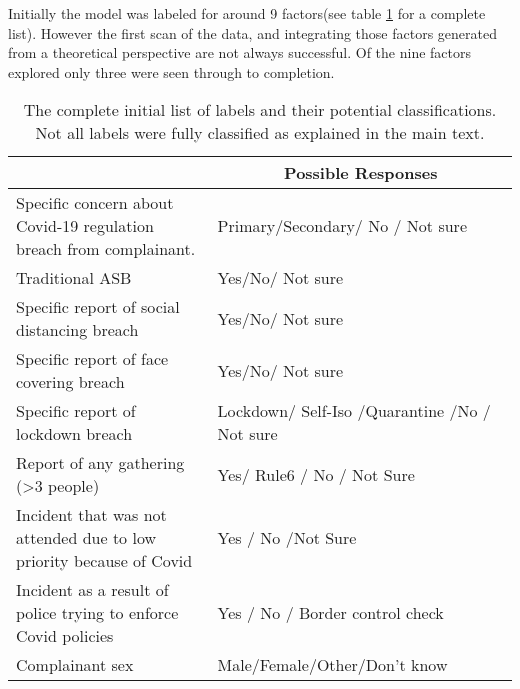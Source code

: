 Initially the model was labeled for around 9 factors(see table \ref{tab:asb_labs} for a complete list). However the first scan of the data, and integrating those factors generated from a theoretical perspective are not always successful. Of the nine factors explored only three were seen through to completion.  
\setlength{\extrarowheight}{12pt}
\begin{table}[]
\centering
\begin{tabular}{p{0.4\linewidth}|p{0.6\linewidth}}
\toprule
\rowcolor[HTML]{C0C0C0} 
\multicolumn{1}{c}{\cellcolor[HTML]{C0C0C0}\textbf{Label}}          & \multicolumn{1}{c}{\cellcolor[HTML]{C0C0C0}\textbf{Possible Responses}} \\ \midrule
Specific concern about Covid-19 regulation breach from complainant.     & Primary/Secondary/ No / Not sure          \\
Traditional ASB                                                         & Yes/No/ Not sure                          \\
Specific report of social distancing breach                             & Yes/No/ Not sure                          \\
Specific report of face covering breach                                 & Yes/No/ Not sure                          \\
Specific report of lockdown breach                                      & Lockdown/ Self-Iso /Quarantine /No / Not sure \\
Report of any gathering (>3 people)                                     & Yes/ Rule6 / No / Not Sure                \\
Incident that was not attended due to low priority because of Covid     & Yes / No /Not Sure                        \\
Incident as a result of police trying to enforce Covid policies         & Yes / No / Border control check           \\
Complainant sex                                                         & Male/Female/Other/Don’t know              \\ \bottomrule
\end{tabular}
\caption{\label{tab:asb_labs} The complete initial list of labels and their potential classifications. Not all labels were fully classified as explained in the main text.}
\end{table}
